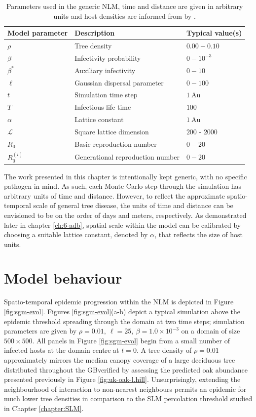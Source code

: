 \begin{table}
\centering
\begin{tabular}{l l l}
\hline
\textbf{Model parameter} & \textbf{Description} & \textbf{Typical value(s)}\\
\hline
$\rho$  & Tree density & $0.00 - 0.10$ \\ 
$\beta$ & Infectivity probability & $0 - 10^{-3}$ \\
$\beta^*$ & Auxiliary infectivity & $0 - 10$ \\
$\ell$ & Gaussian dispersal parameter & $ 0 - 100$ \\
$t$ & Simulation time step & $1\ \mathrm{Au}$\\
$T$ & Infectious life time & $100$  \\
$\alpha$ & Lattice constant & $1\ \mathrm{Au}$ \\
$\mathcal{L}$ & Square lattice dimension & $200$ - $2000$ \\
$R_0$ & Basic reproduction number & $0-20$ \\
$R_0^{(i)}$ & Generational reproduction number & $0-20$ \\
\hline
\end{tabular}
\caption{Parameters used in the generic NLM, time and distance are given in arbitrary units and host densities are informed from by \cite{hill.data}.}
\label{tab:SIR-model}
\end{table}

The work presented in this chapter is intentionally kept generic, with no specific pathogen in mind.
As such, each Monte Carlo step through the simulation has arbitrary units of time and distance.
However, to reflect the approximate spatio-temporal scale of general tree disease, the units of time and distance can be envisioned to be on the order of days and meters, respectively.
As demonstrated later in chapter \ref{ch:6-adb}, spatial scale within the model can be calibrated by choosing a suitable lattice constant, denoted by $\alpha$, that reflects the size of host units.

\section{Model behaviour}

Spatio-temporal epidemic progression within the NLM is depicted in Figure \ref{fig:sgm-evol}.
Figures \ref{fig:sgm-evol}(a-b) depict a typical simulation above the epidemic threshold spreading through the domain at two time steps;
simulation parameters are given by $\rho=0.01,\ \ell = 25,\ \beta = 1.0 \times 10^{-3}$ on a domain of size $500 \times 500$.
All panels in Figure \ref{fig:sgm-evol} begin from a small number of infected hosts at the domain centre at $t=0$.
A tree density of $\rho = 0.01$ approximately mirrors the median canopy coverage of a large deciduous tree distributed throughout the GB\textemdash verified by assessing the predicted oak abundance presented previously in Figure \ref{fig:uk-oak-l.hill}.
Unsurprisingly, extending the neighbourhood of interaction to non-nearest neighbours permits an epidemic for much lower tree densities in comparison to the SLM percolation threshold studied in Chapter \ref{chapter:SLM}.

